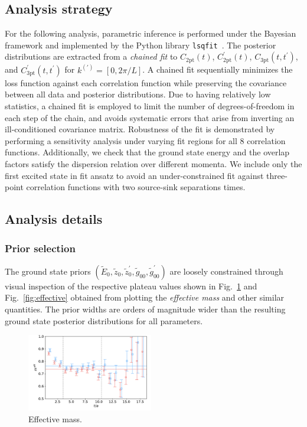 \documentclass[prd,aps,twocolumn,superscriptaddress,tightenlines,nofootinbib,floatfix,preprintnumbers,10pt]{revtex4-1}
\begin{document}
\subsection{Analysis strategy}
For the following analysis, parametric inference is performed under the Bayesian framework and implemented by the Python library \texttt{lsqfit}~\cite{lsqfit-9.3}. The posterior distributions are extracted from a \textit{chained fit} to $C_{\mathrm{2pt}}(t)$, $C^\prime_{\mathrm{2pt}}(t)$, $C_{\mathrm{3pt}}(t,t^\prime)$, and $C^\prime_{\mathrm{3pt}}(t,t^\prime)$ for $k^{(\prime)}=[0,2\pi/L]$. A chained fit sequentially minimizes the loss function against each correlation function while preserving the covariance between all data and posterior distributions. Due to having relatively low statistics, a chained fit is employed to limit the number of degrees-of-freedom in each step of the chain, and avoids systematic errors that arise from inverting an ill-conditioned covariance matrix. Robustness of the fit is demonstrated by performing a sensitivity analysis under varying fit regions for all 8 correlation functions. Additionally, we check that the ground state energy and the overlap factors satisfy the dispersion relation over different momenta. We include only the first excited state in fit ansatz to avoid an under-constrained fit against three-point correlation functions with two source-sink separations times.

\subsection{Analysis details}
\subsubsection{Prior selection}
The ground state priors $(\tilde{E}_0, \tilde{z}_0, \tilde{z}^\prime_0, \tilde{g}_{00}, \tilde{g}^\prime_{00})$ are loosely constrained through visual inspection of the respective plateau values shown in Fig.~\ref{fig:effective_mass} and Fig.~\ref{fig:effective} obtained from plotting the \textit{effective mass} and other similar quantities. The prior widths are orders of magnitude wider than the resulting ground state posterior distributions for all parameters.

\begin{figure}[t]{
	\includegraphics[width=0.49\textwidth]{figures/3296_meff.pdf}
	\caption{Effective mass.}
	\label{fig:effective_mass}
}\end{figure}
\end{document}
